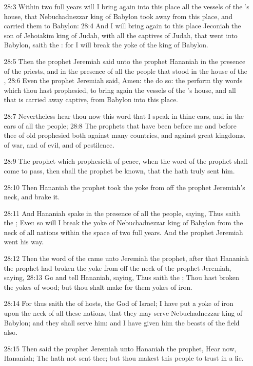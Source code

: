 28:3 Within two full years will I bring again into this place all the
vessels of the \LORD's house, that Nebuchadnezzar king of Babylon took
away from this place, and carried them to Babylon: 28:4 And I will
bring again to this place Jeconiah the son of Jehoiakim king of Judah,
with all the captives of Judah, that went into Babylon, saith the
\LORD: for I will break the yoke of the king of Babylon.

28:5 Then the prophet Jeremiah said unto the prophet Hananiah in the
presence of the priests, and in the presence of all the people that
stood in the house of the \LORD, 28:6 Even the prophet Jeremiah said,
Amen: the \LORD do so: the \LORD perform thy words which thou hast
prophesied, to bring again the vessels of the \LORD's house, and all
that is carried away captive, from Babylon into this place.

28:7 Nevertheless hear thou now this word that I speak in thine ears,
and in the ears of all the people; 28:8 The prophets that have been
before me and before thee of old prophesied both against many
countries, and against great kingdoms, of war, and of evil, and of
pestilence.

28:9 The prophet which prophesieth of peace, when the word of the
prophet shall come to pass, then shall the prophet be known, that the
\LORD hath truly sent him.

28:10 Then Hananiah the prophet took the yoke from off the prophet
Jeremiah's neck, and brake it.

28:11 And Hananiah spake in the presence of all the people, saying,
Thus saith the \LORD; Even so will I break the yoke of Nebuchadnezzar
king of Babylon from the neck of all nations within the space of two
full years. And the prophet Jeremiah went his way.

28:12 Then the word of the \LORD came unto Jeremiah the prophet, after
that Hananiah the prophet had broken the yoke from off the neck of the
prophet Jeremiah, saying, 28:13 Go and tell Hananiah, saying, Thus
saith the \LORD; Thou hast broken the yokes of wood; but thou shalt
make for them yokes of iron.

28:14 For thus saith the \LORD of hosts, the God of Israel; I have put
a yoke of iron upon the neck of all these nations, that they may serve
Nebuchadnezzar king of Babylon; and they shall serve him: and I have
given him the beasts of the field also.

28:15 Then said the prophet Jeremiah unto Hananiah the prophet, Hear
now, Hananiah; The \LORD hath not sent thee; but thou makest this
people to trust in a lie.

